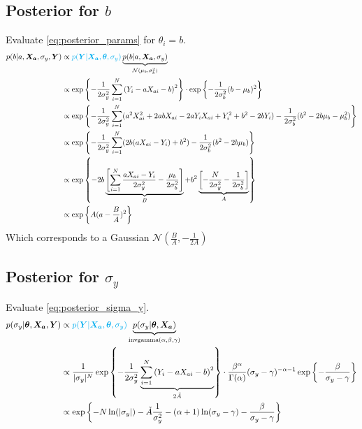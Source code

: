 \documentclass[10pt]{article}
\renewcommand{\vec}[1]{\boldsymbol{#1}}
\begin{document}
\subsection{Posterior for $b$}
Evaluate \cref{eq:posterior_params} for $\theta_i= b$.
\begin{align}
    p(b|a, \vec{X_a}, \sigma_y, \vec{Y}) &\propto {\color{cyan} p(\vec{Y} | \vec{X_a}, \vec{\theta}, \sigma_y)} \underbrace{p(b | a, \vec{X_a}, \sigma_{y})}_{\mathcal{N}(\mu_b, \sigma_b^2)} \\
    &\propto \exp\left\{ - \frac{1}{2\sigma_y^2} \sum_{i=1}^N \left( Y_i - a X_{ai} - b \right)^2 \right\} \cdot \exp\left\{ - \frac{1}{2\sigma_b^2} ( b - \mu_b )^2 \right\} \\
    &\propto \exp\left\{ - \frac{1}{2\sigma_y^2} \sum_{i=1}^N (a^2 X_{ai}^2  + 2 a b X_{ai} - 2 a Y_i X_{ai} + Y_i^2 + b^2 -2 b Y_i )- \frac{1}{2\sigma_b^2} ( b^2 - 2 b \mu_b - \mu_b^2 ) \right\} \\
    &\propto \exp\left\{ - \frac{1}{2\sigma_y^2} \sum_{i=1}^N (2 b (a X_{ai} - Y_i) + b^2 ) - \frac{1}{2\sigma_b^2} ( b^2 - 2 b \mu_b ) \right\} \\
    &\propto \exp\left\{ - 2 b \underbrace{\left[ \sum_{i=1}^N \frac{a X_{ai} - Y_i}{2\sigma_y^2} - \frac{\mu_b}{2\sigma_b^2} \right]}_{B} + b^2 \underbrace{\left[ - \frac{N}{2\sigma_y^2}  - \frac{1}{2\sigma_b^2} \right]}_{A} \right\} \\
    &\propto \exp\left\{A (a - \frac{B}{A})^2\right\}
\end{align}
Which corresponds to a Gaussian $\mathcal{N}(\frac{B}{A}, -\frac{1}{2A})$

\subsection{Posterior for $\sigma_y$}
Evaluate \cref{eq:posterior_sigma_y}.
\begin{align}
    p(\sigma_y | \vec{\theta}, \vec{X_a}, \vec{Y}) &\propto {\color{cyan} p(\vec{Y} | \vec{X_a}, \vec{\theta}, \sigma_y)} \underbrace{p(\sigma_y | \vec{\theta}, \vec{X_a})}_{\text{invgamma}(\alpha, \beta, \gamma)} \\
    &\propto 
        \frac{1}{|\sigma_y|^N} \exp\left\{ - \frac{1}{2\sigma_y^2} \underbrace{\sum_{i=1}^N \left( Y_i - a X_{ai} - b \right)^2}_{2 \tilde{A}} \right\} 
        \cdot
        \frac{\beta^{\alpha}}{\Gamma(\alpha)} (\sigma_y - \gamma)^{-\alpha-1} \exp\left\{ - \frac{\beta}{\sigma_y - \gamma} \right\} \\
    &\propto
        \exp\left\{
            - N \ln(|\sigma_y|) 
            - \tilde{A} \frac{1}{\sigma_y^2}
            - (\alpha + 1) \ln(\sigma_y - \gamma)
            - \frac{\beta}{\sigma_y - \gamma}
        \right\} 
\end{align}
\end{document}
